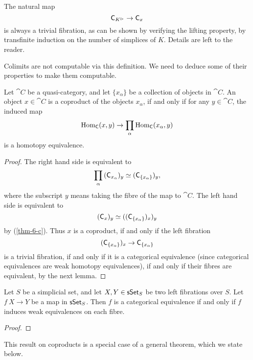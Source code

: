 \begin{remark}\label{thm-6-c}
    The natural map 
    \[ \mathsf{C}_{K^\vartriangleright\/}\to\mathsf{C}_{x\/} \]
    is always a trivial fibration,
    as can be shown by verifying the lifting property,
    by transfinite induction on the number of simplices of $K$.
    Details are left to the reader. \varqed
\end{remark}

Colimits are not computable via this definition.
We need to deduce some of their properties to make them computable.

\begin{proposition}\label{thm-6-z}
    Let $\cat C$ be a quasi-category,
    and let $\{x_\alpha\}$ be a collection of objects in $\cat C$.
    An object $x\in\cat C$ is a coproduct of the objects $x_\alpha$,
    if and only if for any $y\in\cat C$, the induced map 
    \[ \operatorname{Hom}_{\mathsf{C}}(x,y)\to\prod_\alpha\operatorname{Hom}_{\mathsf{C}}(x_\alpha,y) \]
    is a homotopy equivalence.
\end{proposition}

\begin{proof}
    The right hand side is equivalent to  
    \[ \prod_\alpha{}(\mathsf{C}_{x_\alpha\/})_y
    \simeq (\mathsf{C}_{\{x_\alpha\}\/})_y, \]
    where the subscript $y$ means taking the fibre of the map to $\cat C$.
    The left hand side is equivalent to 
    \[ (\mathsf{C}_{x\/})_y\simeq((\mathsf{C}_{\{x_\alpha\}\/})_{x\/})_y \]
    by (\ref{thm-6-c}). Thus $x$ is a coproduct, if and only if the left fibration
    \[(\mathsf{C}_{\{x_\alpha\}\/})_{x\/}\to\mathsf{C}_{\{x_\alpha\}\/}\]
    is a trivial fibration,
    if and only if it is a categorical equivalence (since categorical equivalences are weak homotopy equivalences),
    if and only if their fibres are equivalent, by the next lemma.
\end{proof}

\begin{lemma}
    Let $S$ be a simplicial set, and let $X,Y\in\mathsf{sSet}_{\/S}$
    be two left fibrations over $S$.
    Let $f\:X\to Y$ be a map in $\mathsf{sSet}_{\/S}$.
    Then $f$ is a categorical equivalence if and only if 
    $f$ induces weak equivalences on each fibre.
\end{lemma}

\begin{proof}
    \nyw
\end{proof}

This result on coproducts is a special case of a general theorem,
which we state below.


